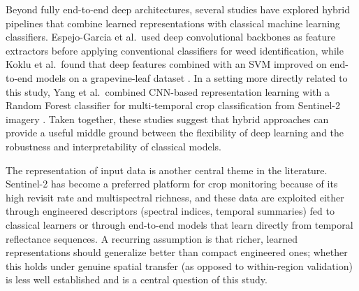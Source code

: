 \documentclass[pdflatex,sn-mathphys]{sn-jnl} %
\begin{document}
Beyond fully end-to-end deep architectures, several studies have explored hybrid pipelines that combine learned representations with classical machine learning classifiers. Espejo-Garcia et al.\ used deep convolutional backbones as feature extractors before applying conventional classifiers for weed identification, while Koklu et al.\ found that deep features combined with an SVM improved on end-to-end models on a grapevine-leaf dataset \cite{espejo2020, koklu2022}. In a setting more directly related to this study, Yang et al.\ combined CNN-based representation learning with a Random Forest classifier for multi-temporal crop classification from Sentinel-2 imagery \cite{yang2020}. Taken together, these studies suggest that hybrid approaches can provide a useful middle ground between the flexibility of deep learning and the robustness and interpretability of classical models.

The representation of input data is another central theme in the literature. Sentinel-2 has become a preferred platform for crop monitoring because of its high revisit rate and multispectral richness, and these data are exploited either through engineered descriptors (spectral indices, temporal summaries) fed to classical learners or through end-to-end models that learn directly from temporal reflectance sequences. A recurring assumption is that richer, learned representations should generalize better than compact engineered ones; whether this holds under genuine spatial transfer (as opposed to within-region validation) is less well established and is a central question of this study.
\end{document}
